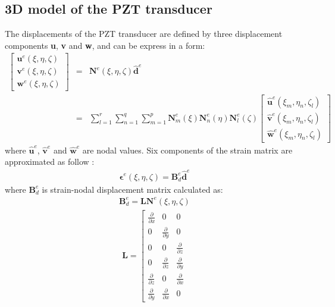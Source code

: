 \documentclass[materials,article,submit,moreauthors,pdftex]{Definitions/mdpi}
\begin{document}
{\subsection{3D model of the PZT transducer}
\label{sec:3D_SEM}
The displacements of the PZT transducer are defined by three displacement components \textbf{u}, \textbf{v} and \textbf{w}, and can be express in a form:
\begin{eqnarray}
\left [ \begin{array}{c}
\textbf{u}^e(\xi,\eta,\zeta) \\
\textbf{v}^e(\xi,\eta,\zeta) \\
\textbf{w}^e(\xi,\eta,\zeta)
\end{array} \right]
& = & \textbf{N}^e(\xi,\eta, \zeta)\widehat{\textbf{d}}^e\nonumber\\
& = & \sum_{l=1}^r\sum_{n=1}^q\sum_{m=1}^p\textbf{N}_m^e(\xi)\textbf{N}_n^e(\eta)\textbf{N}_l^e(\zeta)
\left [ \begin{array}{c}
\widehat{\textbf{u}}^e(\xi_m,\eta_n,\zeta_l) \\
\widehat{\textbf{v}}^e(\xi_m,\eta_n,\zeta_l) \\
\widehat{\textbf{w}}^e(\xi_m,\eta_n,\zeta_l)
\end{array} \right]
\label{eq:3D_displ}
\end{eqnarray}
where \(\widehat{\textbf{u}}^e\), \(\widehat{\textbf{v}}^e\) and 
\(\widehat{\textbf{w}}^e\) are nodal values.
Six components of the strain matrix are approximated as follow \cite{kudela20093d}:
\begin{eqnarray}
\boldsymbol{\epsilon}^e(\xi,\eta,\zeta)=\textbf{B}_{d}^e\widehat{\textbf{d}}^e
\end{eqnarray}
where \(\textbf{B}_{d}^e\) is strain-nodal displacement matrix calculated as:
\begin{eqnarray}
\textbf{B}_{d}^e=\textbf{L}\textbf{N}^e(\xi,\eta,\zeta)
\end{eqnarray}
\begin{eqnarray}
\textbf{L}=\left [
\begin{array}{ccc}
\frac{\partial }{\partial x} & 0 & 0\\
0 & \frac{\partial }{\partial y} & 0\\
0 & 0 & \frac{\partial }{\partial z}\\
0 & \frac{\partial }{\partial z} & \frac{\partial }{\partial y}\\
\frac{\partial }{\partial z} & 0 & \frac{\partial }{\partial x}\\
\frac{\partial }{\partial y} & \frac{\partial }{\partial x} & 0

\end{array}
\end{eqnarray}}
\end{document}
